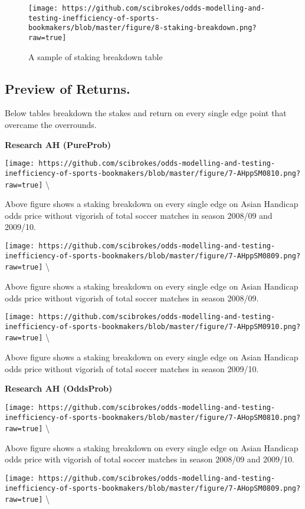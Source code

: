 \documentclass[article]{jss}
\begin{document}
\begin{figure}[htbp]
\centering
\texttt{[image: https://github.com/scibrokes/odds-modelling-and-testing-inefficiency-of-sports-bookmakers/blob/master/figure/8-staking-breakdown.png?raw=true]}
\caption{A sample of staking breakdown table}
\end{figure}

\subsection{Preview of Returns.}\label{preview-of-returns.}

Below tables breakdown the stakes and return on every single edge point
that overcame the overrounds. \bigbreak

\textbf{Research AH (PureProb)} \bigbreak

\texttt{[image: https://github.com/scibrokes/odds-modelling-and-testing-inefficiency-of-sports-bookmakers/blob/master/figure/7-AHppSM0810.png?raw=true]}
\textbackslash{}

Above figure shows a staking breakdown on every single edge on Asian
Handicap odds price without vigorish of total soccer matches in season
2008/09 and 2009/10.

\texttt{[image: https://github.com/scibrokes/odds-modelling-and-testing-inefficiency-of-sports-bookmakers/blob/master/figure/7-AHppSM0809.png?raw=true]}
\textbackslash{}

Above figure shows a staking breakdown on every single edge on Asian
Handicap odds price without vigorish of total soccer matches in season
2008/09.

\texttt{[image: https://github.com/scibrokes/odds-modelling-and-testing-inefficiency-of-sports-bookmakers/blob/master/figure/7-AHppSM0910.png?raw=true]}
\textbackslash{}

Above figure shows a staking breakdown on every single edge on Asian
Handicap odds price without vigorish of total soccer matches in season
2009/10. \bigbreak

\textbf{Research AH (OddsProb)} \bigbreak

\texttt{[image: https://github.com/scibrokes/odds-modelling-and-testing-inefficiency-of-sports-bookmakers/blob/master/figure/7-AHopSM0810.png?raw=true]}
\textbackslash{}

Above figure shows a staking breakdown on every single edge on Asian
Handicap odds price with vigorish of total soccer matches in season
2008/09 and 2009/10.

\texttt{[image: https://github.com/scibrokes/odds-modelling-and-testing-inefficiency-of-sports-bookmakers/blob/master/figure/7-AHopSM0809.png?raw=true]}
\textbackslash{}
\end{document}
